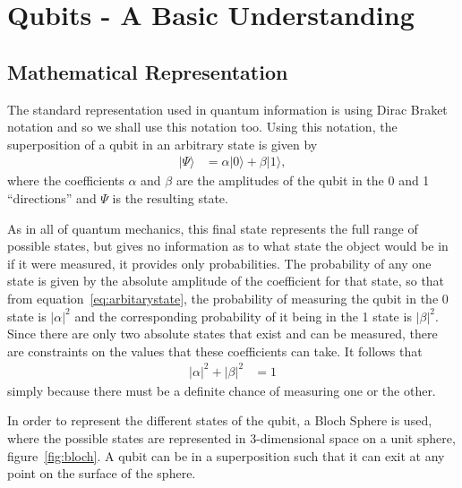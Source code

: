 
\section{Qubits - A Basic Understanding}
\subsection{Mathematical Representation}
The standard representation used in quantum information is using Dirac Braket notation and so we shall use this notation too. Using this notation, the superposition of a qubit in an arbitrary state is given by
\begin{align}
	|\Psi\rangle &= \alpha|0\rangle + \beta|1\rangle,\label{eq:arbitarystate}
\end{align}
where the coefficients $\alpha$ and $\beta$ are the amplitudes of the qubit in the 0 and 1 ``directions'' and $\Psi$ is the resulting state.

As in all of quantum mechanics, this final state represents the full range of possible states, but gives no information as to what state the object would be in if it were measured, it provides only probabilities. The probability of any one state is given by the absolute amplitude of the coefficient for that state, so that from equation~\ref{eq:arbitarystate}, the probability of measuring the qubit in the 0 state is $|\alpha|^2$ and the corresponding probability of it being in the 1 state is $|\beta|^2$. Since there are only two absolute states that exist and can be measured, there are constraints on the values that these coefficients can take. It follows that 
\begin{align}
	|\alpha|^2 + |\beta|^2 &= 1 \label{eq:constraint}
\end{align}
simply because there must be a definite chance of measuring one or the other.

In order to represent the different states of the qubit, a Bloch Sphere is used, where the possible states are represented in 3-dimensional space on a unit sphere\cite{gentleintro}, figure~\ref{fig:bloch}. A qubit can be in a superposition such that it can exit at any point on the surface of the sphere. 


